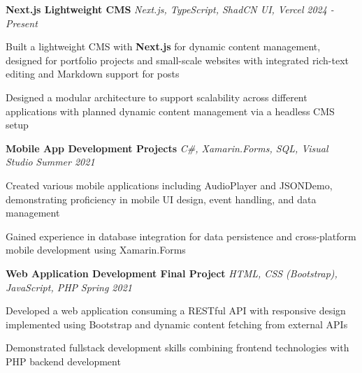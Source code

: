 \documentclass[letterpaper]{article}
\begin{document}
    {\textbf{Next.js Lightweight CMS}} {\sl Next.js, TypeScript, ShadCN UI, Vercel} \hfill \textsl{2024 - Present}\\
    \vspace{-2mm}
    \begin{tightitemize} \itemsep -1mm

        \item Built a lightweight CMS with \textbf{Next.js} for dynamic content management, designed for portfolio projects and small-scale websites with integrated rich-text editing and Markdown support for posts
        
        \item Designed a modular architecture to support scalability across different applications with planned dynamic content management via a headless CMS setup
        
    \end{tightitemize}
    \vspace{-2mm}

    {\textbf{Mobile App Development Projects}} {\sl C\#, Xamarin.Forms, SQL, Visual Studio} \hfill \textsl{Summer 2021}\\
    \vspace{-2mm}
    \begin{tightitemize} \itemsep -1mm

        \item Created various mobile applications including AudioPlayer and JSONDemo, demonstrating proficiency in mobile UI design, event handling, and data management
        
        \item Gained experience in database integration for data persistence and cross-platform mobile development using Xamarin.Forms
        
    \end{tightitemize}
    \vspace{-2mm}

    {\textbf{Web Application Development Final Project}} {\sl HTML, CSS (Bootstrap), JavaScript, PHP} \hfill \textsl{Spring 2021}\\
    \vspace{-2mm}
    \begin{tightitemize} \itemsep -1mm

        \item Developed a web application consuming a RESTful API with responsive design implemented using Bootstrap and dynamic content fetching from external APIs
        
        \item Demonstrated fullstack development skills combining frontend technologies with PHP backend development
        
    \end{tightitemize}
    \vspace{-2mm}
\end{document}
